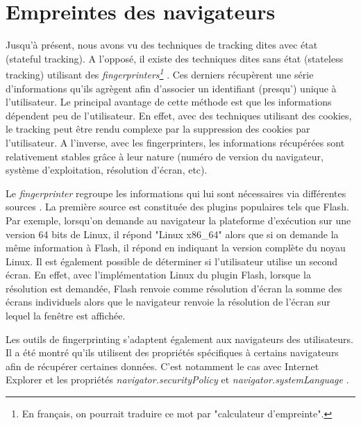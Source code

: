 \section{Empreintes des navigateurs}
\label{fingerprinters}
Jusqu'à présent, nous avons vu des techniques de tracking dites avec état (stateful tracking). A l'opposé, il existe des techniques dites sans état (stateless tracking) utilisant des \textit{fingerprinters\footnote{En français, on pourrait traduire ce mot par "calculateur d'empreinte".}} \cite{Mayer:2012:TWT:2310656.2310703}. Ces derniers récupèrent une série d'informations qu'ils agrègent afin d'associer un identifiant (presqu') unique à l'utilisateur. Le principal avantage de cette méthode est que les informations dépendent peu de l'utilisateur.
En effet, avec des techniques utilisant des cookies, le tracking peut être rendu complexe par la suppression des cookies par l'utilisateur. A l'inverse, avec les fingerprinters, les informations récupérées sont relativement stables grâce à leur nature (numéro de version du navigateur, système d'exploitation, résolution d'écran, etc).
\newline

Le \textit{fingerprinter} regroupe les informations qui lui sont nécessaires via différentes sources \cite{Nikiforakis:2013:CME:2497621.2498133}. La première source est constituée des plugins populaires tels que Flash. Par exemple, lorsqu'on demande au navigateur la plateforme d'exécution sur une version 64 bits de Linux, il répond "Linux x86\_64" alors que si on demande la même information à Flash, il répond en indiquant la version complète du noyau Linux. Il est également possible de déterminer si l'utilisateur utilise un second écran. En effet, avec l'implémentation Linux du plugin Flash, lorsque la résolution est demandée, Flash renvoie comme résolution d'écran la somme des écrans individuels alors que le navigateur renvoie la résolution de l'écran sur lequel la fenêtre est affichée.

Les outils de fingerprinting s'adaptent également aux navigateurs des utilisateurs. Il a été montré qu'ils utilisent des propriétés spécifiques à certains navigateurs afin de récupérer certaines données. C'est notamment le cas avec Internet Explorer et les propriétés \textit{navigator.securityPolicy} et \textit{navigator.systemLanguage} \cite{Nikiforakis:2013:CME:2497621.2498133}.

